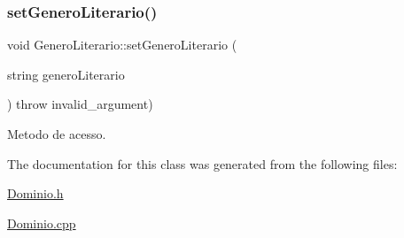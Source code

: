 \subsubsection{\texorpdfstring{set\+Genero\+Literario()}{setGeneroLiterario()}}
{\footnotesize\ttfamily void Genero\+Literario\+::set\+Genero\+Literario (\begin{DoxyParamCaption}\item[{string}]{genero\+Literario }\end{DoxyParamCaption}) throw  invalid\+\_\+argument) }

Metodo de acesso. 

The documentation for this class was generated from the following files\+:\begin{DoxyCompactItemize}
\item 
\hyperlink{_dominio_8h}{Dominio.\+h}\item 
\hyperlink{_dominio_8cpp}{Dominio.\+cpp}\end{DoxyCompactItemize}
